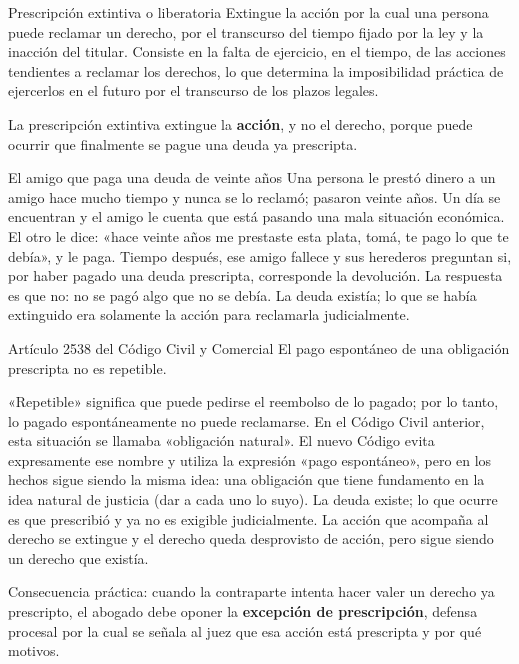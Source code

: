 \documentclass[12pt,oneside]{book}
\begin{document}
\begin{definition}{Prescripción extintiva o liberatoria}
Extingue la acción por la cual una persona puede reclamar un derecho, por el transcurso del tiempo fijado por la ley y la inacción del titular. Consiste en la falta de ejercicio, en el tiempo, de las acciones tendientes a reclamar los derechos, lo que determina la imposibilidad práctica de ejercerlos en el futuro por el transcurso de los plazos legales.
\end{definition}

\begin{important}
La prescripción extintiva extingue la \textbf{acción}, y no el derecho, porque puede ocurrir que finalmente se pague una deuda ya prescripta.
\end{important}

\begin{example}{El amigo que paga una deuda de veinte años}
Una persona le prestó dinero a un amigo hace mucho tiempo y nunca se lo reclamó; pasaron veinte años. Un día se encuentran y el amigo le cuenta que está pasando una mala situación económica. El otro le dice: «hace veinte años me prestaste esta plata, tomá, te pago lo que te debía», y le paga. Tiempo después, ese amigo fallece y sus herederos preguntan si, por haber pagado una deuda prescripta, corresponde la devolución. La respuesta es que no: no se pagó algo que no se debía. La deuda existía; lo que se había extinguido era solamente la acción para reclamarla judicialmente.
\end{example}

\begin{articulo}{Artículo 2538 del Código Civil y Comercial}
El pago espontáneo de una obligación prescripta no es repetible.
\end{articulo}

«Repetible» significa que puede pedirse el reembolso de lo pagado; por lo tanto, lo pagado espontáneamente no puede reclamarse. En el Código Civil anterior, esta situación se llamaba «obligación natural». El nuevo Código evita expresamente ese nombre y utiliza la expresión «pago espontáneo», pero en los hechos sigue siendo la misma idea: una obligación que tiene fundamento en la idea natural de justicia (dar a cada uno lo suyo). La deuda existe; lo que ocurre es que prescribió y ya no es exigible judicialmente. La acción que acompaña al derecho se extingue y el derecho queda desprovisto de acción, pero sigue siendo un derecho que existía.

Consecuencia práctica: cuando la contraparte intenta hacer valer un derecho ya prescripto, el abogado debe oponer la \textbf{excepción de prescripción}, defensa procesal por la cual se señala al juez que esa acción está prescripta y por qué motivos.
\end{document}
